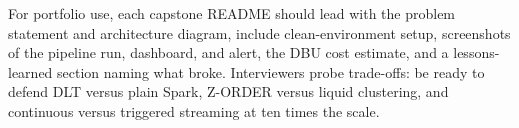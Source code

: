 \begin{tipbox}
For portfolio use, each capstone README should lead with the problem statement and architecture
diagram, include clean-environment setup, screenshots of the pipeline run, dashboard, and alert,
the DBU cost estimate, and a lessons-learned section naming what broke. Interviewers probe
trade-offs: be ready to defend DLT versus plain Spark, Z-ORDER versus liquid clustering, and
continuous versus triggered streaming at ten times the scale.
\end{tipbox}
